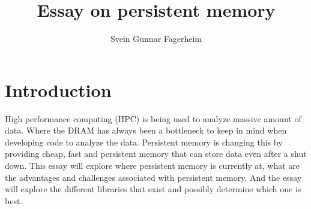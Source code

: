 \documentclass[12pt,a4paper,UKenglish]{article}
\title{Essay on persistent memory}  %
\author{Svein Gunnar Fagerheim}      %
\begin{document}
\maketitle                   %

\section{Introduction}
High performance computing (HPC) is being used to analyze massive amount of data. Where the DRAM has always been a bottleneck to keep in mind when developing code to analyze the data. Persistent memory is changing this by providing cheap, fast and persistent memory that can store data even after a shut down.
This essay will explore where persistent memory is currently at, what are the advantages and challenges associated with persistent memory. And the essay will explore the different libraries that exist and possibly determine which one is best.
\end{document}
